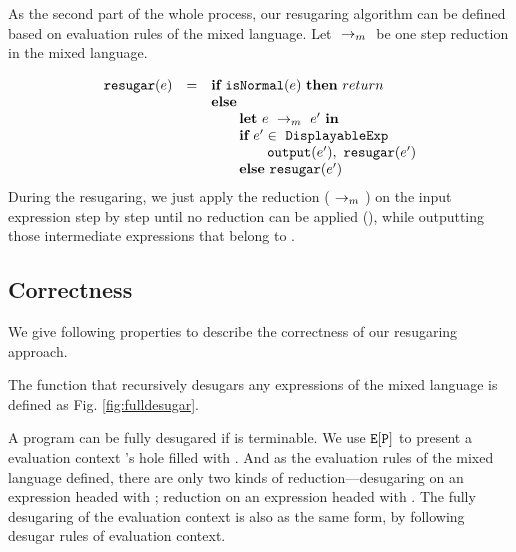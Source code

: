 
As the second part of the whole process, our resugaring algorithm can be defined based on evaluation rules of the mixed language. Let $~\rightarrow_m~$ be one step reduction in the mixed language.

\[
\begin{array}{llll}
\mbox{\tt resugar} (e) &=& \mbox{\rm \bf if}~\mbox{\tt isNormal}(e)~\mbox{\rm \bf then}~return\\
              & & \mbox{\rm \bf else}~\\
							& & \qquad \mbox{\rm \bf let}~e ~\rightarrow_m~e'~\mbox{\rm \bf in}\\
							& & \qquad \mbox{\rm \bf if}~e' \in~\mbox{\tt DisplayableExp} \\
							& & \qquad \qquad \mbox{\tt output}(e'),~\mbox{\tt resugar}(e')\\
							& & \qquad \mbox{\rm \bf else}~\mbox{\tt resugar}(e')
\end{array}
\]
During the resugaring, we just apply the reduction ($~\rightarrow_m~$) on the input expression step by step until no reduction can be applied (), while outputting those intermediate expressions that belong to .


\subsection{Correctness}
\label{mark:correct}

We give following properties to describe the correctness of our resugaring approach.
\begin{Def} The function that recursively desugars any expressions of the mixed language is defined as Fig.  \ref{fig:fulldesugar}.\end{Def}

A program  can be fully desugared if  is terminable. We use $\mbox{\tt E}[\mbox{\tt P}]$ to present a evaluation context 's hole filled with . And as the evaluation rules of the mixed language defined, there are only two kinds of reduction---desugaring on an expression headed with ; reduction on an expression headed with . The fully desugaring of the evaluation context is also as the same form, by following desugar rules of evaluation context.

